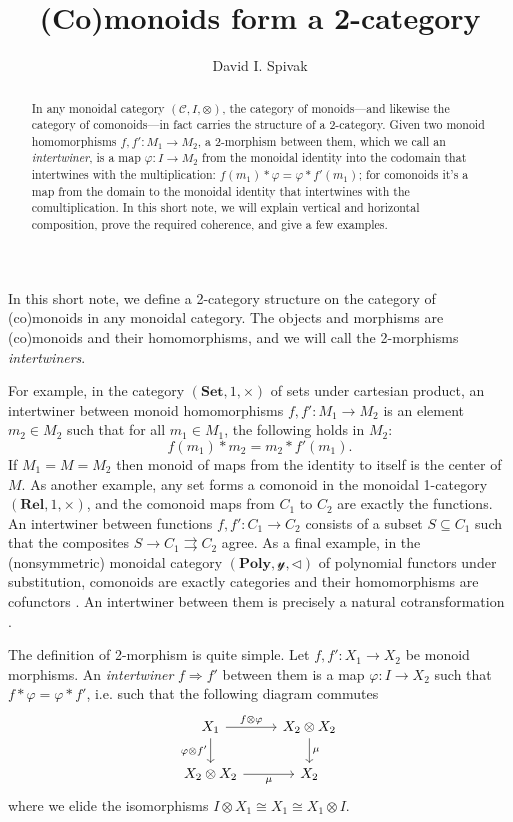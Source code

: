 \documentclass[11pt, one side, article]{memoir}
\theoremstyle{definition}
\theoremstyle{plain}
\newenvironment{definition}
  {\pushQED{\qed}\renewcommand{\qedsymbol}{$\lozenge$}\definitionx}
  {\popQED\enddefinitionx}
\renewcommand{\ss}{\subseteq}
\newcommand{\cat}[1]{\mathcal{#1}}%
\newcommand{\Cat}[1]{\mathbf{#1}}%
\newcommand{\tto}{\rightrightarrows}
\newcommand{\imp}{\Rightarrow}
\newcommand{\smset}{\Cat{Set}}
\newcommand{\yon}{\mathcal{y}}
\newcommand{\poly}{\Cat{Poly}}
\newcommand{\0}{\textsf{0}}
\newcommand{\1}{\tn{\textsf{1}}}
\newcommand{\tri}{\mathbin{\triangleleft}}
\begin{document}
\title{(Co)monoids form a 2-category}

\author{David I. Spivak}


\maketitle

\begin{abstract}
In any monoidal category $(\cat{C},I,\otimes)$, the category of monoids---and likewise the category of comonoids---in fact carries the structure of a 2-category. Given two monoid homomorphisms $f,f'\colon M_1\to M_2$, a 2-morphism between them, which we call an \emph{intertwiner}, is a map $\varphi\colon I\to M_2$ from the monoidal identity into the codomain that intertwines with the multiplication: $f(m_1)*\varphi=\varphi*f'(m_1)$; for comonoids it's a map from the domain to the monoidal identity that intertwines with the comultiplication. In this short note, we will explain vertical and horizontal composition, prove the required coherence, and give a few examples.
\end{abstract}

In this short note, we define a 2-category structure on the category of (co)monoids in any monoidal category. The objects and morphisms are (co)monoids and their homomorphisms, and we will call the 2-morphisms \emph{intertwiners}.

For example, in the category $(\smset,1,\times)$ of sets under cartesian product, an intertwiner between monoid homomorphisms $f,f'\colon M_1\to M_2$ is an element $m_2\in M_2$ such that for all $m_1\in M_1$, the following holds in $M_2$:
\[
f(m_1)*m_2=m_2*f'(m_1).
\]
If $M_1=M=M_2$ then monoid of maps from the identity to itself is the center of $M$. As another example, any set forms a comonoid in the monoidal 1-category $(\Cat{Rel},1,\times)$, and the comonoid maps from $C_1$ to $C_2$ are exactly the functions. An intertwiner between functions $f,f'\colon C_1\to C_2$ consists of a subset $S\ss C_1$ such that the composites $S\to C_1\tto C_2$ agree. As a final example, in the (nonsymmetric) monoidal category $(\poly,\yon,\tri)$ of polynomial functors under substitution, comonoids are exactly categories \cite{ahman2016directed} and their homomorphisms are cofunctors \cite{aguiar1997internal}. An intertwiner between them is precisely a natural cotransformation \cite{clarke2022introduction}.

The definition of 2-morphism is quite simple.
\begin{definition}
Let $f,f'\colon X_1\to X_2$ be monoid morphisms. An \emph{intertwiner} $f\imp f'$ between them is a map $\varphi\colon I\to X_2$ such that  $f*\varphi=\varphi*f'$, i.e. such that the following diagram commutes
\[
\begin{tikzcd}
	X_1\ar[r, "f\otimes \varphi"]\ar[d, "\varphi\otimes f'"']&
	X_2\otimes X_2\ar[d, "\mu"]\\
	X_2\otimes X_2\ar[r, "\mu"']&
	X_2
\end{tikzcd}
\]
where we elide the isomorphisms $I\otimes X_1\cong X_1\cong X_1\otimes I$.
\end{definition}
\end{document}

